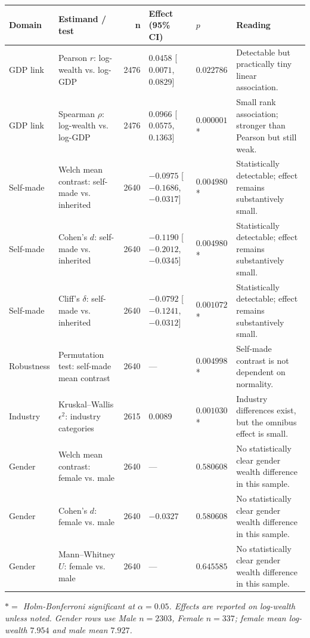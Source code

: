 \begin{tabularx}{\linewidth}{>{\raggedright\arraybackslash}p{1.8cm}Y r >{\raggedright\arraybackslash}p{4.0cm}>{\raggedright\arraybackslash}p{1.45cm}Y}
\toprule
Domain & Estimand / test & n & Effect (95\% CI) & $p$ & Reading \\
\midrule
GDP link & Pearson $r$: log-wealth vs. log-GDP & 2476 & $0.0458$ [$0.0071$, $0.0829$] & $0.022786$ & Detectable but practically tiny linear association. \\
GDP link & Spearman $\rho$: log-wealth vs. log-GDP & 2476 & $0.0966$ [$0.0575$, $0.1363$] & $0.000001$* & Small rank association; stronger than Pearson but still weak. \\
Self-made & Welch mean contrast: self-made vs. inherited & 2640 & $-0.0975$ [$-0.1686$, $-0.0317$] & $0.004980$* & Statistically detectable; effect remains substantively small. \\
Self-made & Cohen's $d$: self-made vs. inherited & 2640 & $-0.1190$ [$-0.2012$, $-0.0345$] & $0.004980$* & Statistically detectable; effect remains substantively small. \\
Self-made & Cliff's $\delta$: self-made vs. inherited & 2640 & $-0.0792$ [$-0.1241$, $-0.0312$] & $0.001072$* & Statistically detectable; effect remains substantively small. \\
Robustness & Permutation test: self-made mean contrast & 2640 & --- & $0.004998$* & Self-made contrast is not dependent on normality. \\
Industry & Kruskal--Wallis $\epsilon^2$: industry categories & 2615 & $0.0089$ & $0.001030$* & Industry differences exist, but the omnibus effect is small. \\
Gender & Welch mean contrast: female vs. male & 2640 & --- & $0.580608$ & No statistically clear gender wealth difference in this sample. \\
Gender & Cohen's $d$: female vs. male & 2640 & $-0.0327$ & $0.580608$ & No statistically clear gender wealth difference in this sample. \\
Gender & Mann--Whitney $U$: female vs. male & 2640 & --- & $0.645585$ & No statistically clear gender wealth difference in this sample. \\
\bottomrule
\end{tabularx}
\vspace{2pt}
\footnotesize\textit{$* =$ Holm-Bonferroni significant at $\alpha=0.05$. Effects are reported on log-wealth unless noted. Gender rows use Male $n=2303$, Female $n=337$; female mean log-wealth $7.954$ and male mean $7.927$.}
